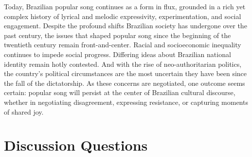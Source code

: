 \documentclass[twoside]{article}
\begin{document}
Today, Brazilian popular song continues as a form in flux, grounded in a
rich yet complex history of lyrical and melodic expressivity,
experimentation, and social engagement. Despite the profound shifts
Brazilian society has undergone over the past century, the issues that
shaped popular song since the beginning of the twentieth century remain
front-and-center. Racial and socioeconomic inequality continues to
impede social progress. Differing ideas about Brazilian national
identity remain hotly contested. And with the rise of neo-authoritarian
politics, the country's political circumstances are the most uncertain
they have been since the fall of the dictatorship. As these concerns are
negotiated, one outcome seems certain: popular song will persist at the
center of Brazilian cultural discourse, whether in negotiating
disagreement, expressing resistance, or capturing moments of shared joy.



\hypertarget{discussion-questions}{%
\section*{Discussion Questions}\label{discussion-questions}}
\end{document}
